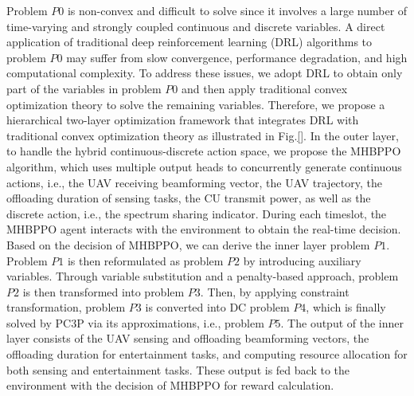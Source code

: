 \documentclass[10pt,journal,compsoc]{IEEEtran}
\begin{document}
Problem $P0$ is non-convex and difficult to solve since it involves a large number of time-varying and strongly coupled continuous and discrete variables.
A direct application of traditional deep reinforcement learning (DRL) algorithms to problem $P0$ may suffer from slow convergence, performance degradation, and high computational complexity.
To address these issues, we adopt DRL to obtain only part of the variables in problem $P0$ and then apply traditional convex optimization theory to solve the remaining variables.
Therefore, we propose a hierarchical two-layer optimization framework that integrates DRL with traditional convex optimization theory as illustrated in Fig.\ref{}.
In the outer layer, to handle the hybrid continuous-discrete action space, we propose the MHBPPO algorithm, which uses multiple output heads to concurrently generate continuous actions, i.e., the UAV receiving beamforming vector, the UAV trajectory, the offloading duration of sensing tasks, the CU transmit power, as well as the discrete action, i.e., the spectrum sharing indicator.
During each timeslot, the MHBPPO agent interacts with the environment to obtain the real-time decision.
Based on the decision of MHBPPO, we can derive the inner layer problem $P1$. 
Problem $P1$ is then reformulated as problem $P2$ by introducing auxiliary variables.
Through variable substitution and a penalty-based approach, problem $P2$ is then transformed into problem $P3$.
Then, by applying constraint transformation, problem $P3$ is converted into DC problem $P4$, which is finally solved by PC3P via its approximations, i.e., problem $P5$. 
The output of the inner layer consists of the UAV sensing and offloading beamforming vectors, the offloading duration for entertainment tasks, and computing resource allocation for both sensing and entertainment tasks.
These output is fed back to the environment with the decision of MHBPPO for reward calculation.
\end{document}
